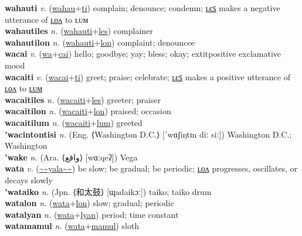 \textbf{wahauti} \textit{v.} (\hyperref[wahau]{wahau}+\hyperref[ti]{ti})
complain; denounce; condemn; \hyperref[wahautiles]{ʟєꜱ} makes a negative utterance of \hyperref[wahautilon]{ʟᴏᴧ} to ʟᴜᴍ \label{wahauti} \\
\textbf{wahautiles} \textit{n.} (\hyperref[wahauti]{wahauti}+\hyperref[les]{les})
complainer \label{wahautiles} \\
\textbf{wahautilon} \textit{n.} (\hyperref[wahauti]{wahauti}+\hyperref[lon]{lon})
complaint; denouncee \label{wahautilon} \\
\textbf{wacai} \textit{v.} (\hyperref[wa]{wa}+\hyperref[cai]{cai})
hello; goodbye; yay; bless; okay; 	extit{positive exclamative mood} \label{wacai} \\
\textbf{wacaiti} \textit{v.} (\hyperref[wacai]{wacai}+\hyperref[ti]{ti})
greet; praise; celebrate; \hyperref[wacaitiles]{ʟєꜱ} makes a positive utterance of \hyperref[wacaitilon]{ʟᴏᴧ} to \hyperref[wacaitilum]{ʟᴜᴍ} \label{wacaiti} \\
\textbf{wacaitiles} \textit{n.} (\hyperref[wacaiti]{wacaiti}+\hyperref[les]{les})
greeter; praiser \label{wacaitiles} \\
\textbf{wacaitilon} \textit{n.} (\hyperref[wacaiti]{wacaiti}+\hyperref[lon]{lon})
praised; occasion \label{wacaitilon} \\
\textbf{wacaitilum} \textit{n.} (\hyperref[wacaiti]{wacaiti}+\hyperref[lum]{lum})
greeted \label{wacaitilum} \\
\textbf{'wacintontisi} \textit{n.} (Eng. ⟨Washington D.C.⟩ [ˈwɑʃiŋtɪn diː siː])
Washington D.C.; Washington \label{'wacintontisi} \\
\textbf{'wake} \textit{n.} (Ara. ⟨واقع‎⟩ [wɑːqeʔ])
Vega \label{'wake} \\
\textbf{wata} \textit{v.} (\hyperref[yala]{\~{}\~{}yala\~{}\~{}})
be slow; be gradual; be periodic; \hyperref[watalon]{ʟᴏᴧ} progresses, oscillates, or decays slowly \label{wata} \\
\textbf{'wataiko} \textit{n.} (Jpn. ⟨和太鼓⟩ [ɰadaikɔː])
taiko; taiko drum \label{'wataiko} \\
\textbf{watalon} \textit{n.} (\hyperref[wata]{wata}+\hyperref[lon]{lon})
slow; gradual; periodic \label{watalon} \\
\textbf{watalyan} \textit{n.} (\hyperref[wata]{wata}+\hyperref[lyan]{lyan})
period; time constant \label{watalyan} \\
\textbf{watamamul} \textit{n.} (\hyperref[wata]{wata}+\hyperref[mamul]{mamul})
sloth \label{watamamul} \\
